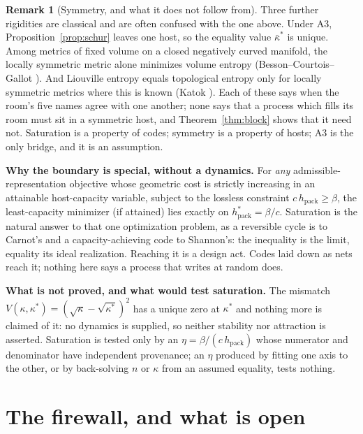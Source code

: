 \documentclass[11pt,reqno]{amsart}
\theoremstyle{plain}
\theoremstyle{definition}
\newtheorem{remark}[theorem]{Remark}
\newcommand{\hpack}{h_{\mathrm{pack}}}
\begin{document}
\begin{remark}[Symmetry, and what it does not follow from]\label{rem:symmetry}
Three further rigidities are classical and are often confused with the one above. Under A3, Proposition~\ref{prop:schur} leaves one host, so the equality value $\bar\kappa^*$ is unique. Among metrics of fixed volume on a closed negatively curved manifold, the locally symmetric metric alone minimizes volume entropy (Besson--Courtois--Gallot \cite{bcg1995}). And Liouville entropy equals topological entropy only for locally symmetric metrics where this is known (Katok \cite{katok1982}). Each of these says when the room's five names agree with one another; none says that a process which fills its room must sit in a symmetric host, and Theorem~\ref{thm:block} shows that it need not. Saturation is a property of codes; symmetry is a property of hosts; A3 is the only bridge, and it is an assumption.
\end{remark}

\noindent\textbf{Why the boundary is special, without a dynamics.} For \emph{any} admissible-representation objective whose geometric cost is strictly increasing in an attainable host-capacity variable, subject to the lossless constraint $c\,\hpack\ge\beta$, the least-capacity minimizer (if attained) lies exactly on $\hpack^*=\beta/c$. Saturation is the natural answer to that one optimization problem, as a reversible cycle is to Carnot's and a capacity-achieving code to Shannon's: the inequality is the limit, equality its ideal realization. Reaching it is a design act. Codes laid down as nets reach it; nothing here says a process that writes at random does.

\medskip
\noindent\textbf{What is not proved, and what would test saturation.} The mismatch $V(\kappa,\kappa^*)=(\sqrt\kappa-\sqrt{\kappa^*})^2$ has a unique zero at $\kappa^*$ and nothing more is claimed of it: no dynamics is supplied, so neither stability nor attraction is asserted. Saturation is tested only by an $\eta=\beta/(c\,\hpack)$ whose numerator and denominator have independent provenance; an $\eta$ produced by fitting one axis to the other, or by back-solving $n$ or $\kappa$ from an assumed equality, tests nothing.

\section{The firewall, and what is open}\label{sec:open}\label{sec:firewall}
\end{document}
